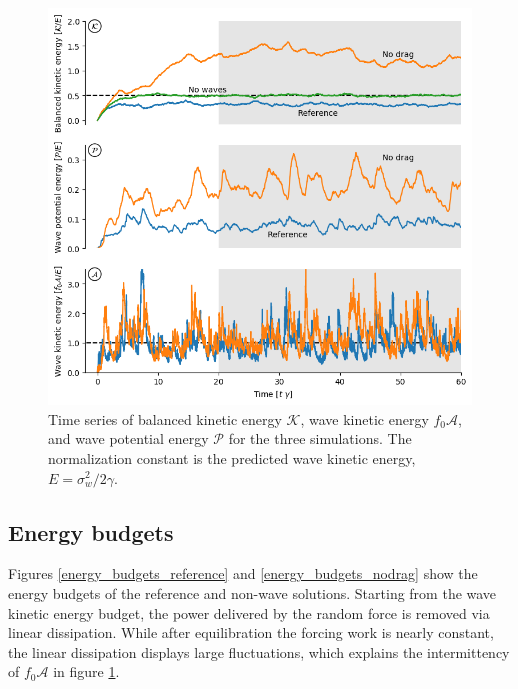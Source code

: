\documentclass[12pt]{article}
\newcommand{\A}{\mathscr{A}}
\newcommand{\K}{\mathscr{K}}
\renewcommand{\P}{\mathscr{P}}
\newcommand{\?}{\stackrel{?}{=}}
\begin{document}
\begin{figure}
\centering
\includegraphics[width=.825\textwidth]{figs/energies_comparison.png}
\caption{Time series of balanced kinetic energy $\K$,   wave kinetic energy $f_0\A$,
          and wave potential energy $\P$ for the three simulations. The normalization
          constant is the predicted wave kinetic energy, $E = \sigma_w^2/2\gamma$.}
        \label{equilibrated_energy}
\end{figure}

\subsection{Energy budgets}
Figures \ref{energy_budgets_reference} and \ref{energy_budgets_nodrag} show the
energy budgets of the reference and non-wave solutions. Starting from the wave kinetic
energy budget, the power delivered by the random force is removed via linear dissipation.
While after equilibration the forcing work is nearly constant, the linear dissipation displays
large fluctuations, which explains the intermittency of $f_0\A$ in figure \ref{equilibrated_energy}.
\end{document}
